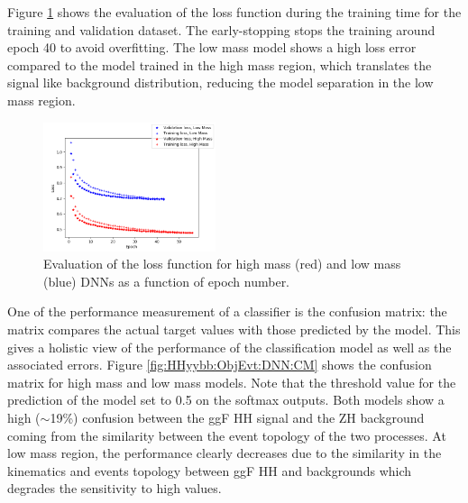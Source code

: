 Figure \ref{fig:HHyybb:ObjEvt:DNN:Loss} shows the evaluation of the loss function during the training time for the training and validation dataset. The early-stopping stops the training around epoch 40 to avoid overfitting. The low mass model shows a high loss error compared to the model trained in the high mass region, which translates the signal like background distribution, reducing the model separation in the low mass region. \\
\begin{figure}[htbp]
    \centering
    \includegraphics[width=0.45\textwidth]{Ch5/Img/Loss_DNN.png}
    \begin{tcolorbox}[colback=black!5!white,colframe=white!75!black]
    \caption{Evaluation of the loss function for high mass (red) and low mass (blue) DNNs as a function of epoch number.}
    \label{fig:HHyybb:ObjEvt:DNN:Loss}
    \end{tcolorbox}
    
\end{figure}
One of the performance measurement of a classifier is the confusion matrix: the matrix compares the actual target values with those predicted by the model. This gives a holistic view of the performance of the classification model as well as the associated errors. Figure \ref{fig:HHyybb:ObjEvt:DNN:CM} shows the confusion matrix for high mass and low mass models. Note that the threshold value for the prediction of the model set to 0.5 on the softmax outputs. Both models show a high ($\sim$19\%) confusion between the ggF HH signal and the ZH background coming from the similarity between the event topology of the two processes. At low mass region, the performance clearly decreases due to the similarity in the kinematics and events topology between ggF HH and backgrounds which degrades the sensitivity to high \kl values.
